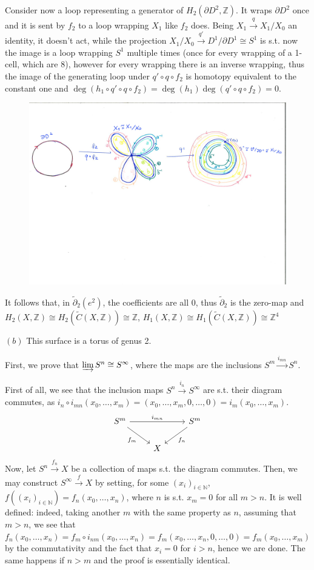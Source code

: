 \documentclass{article}
\newcommand{\numberset}{\mathbb}
\newcommand{\N}{\numberset{N}}
\newcommand{\Z}{\numberset{Z}}
\newcommand{\exercise}[1]{\noindent {\bf Exercise #1}}
\begin{document}
Consider now a loop representing a generator of $H_2(\partial D^2,\Z)$. It wraps $\partial D^2$ once and it is sent by $f_2$ to a loop wrapping $X_1$ like $f_2$ does. Being $X_1\xrightarrow{q} X_1/X_0$ an identity, it doesn't act, while the projection $X_1/X_0\xrightarrow{q'} D^1/\partial D^1\cong S^1$ is s.t. now the image is a loop wrapping $S^1$ multiple times (once for every wrapping of a 1-cell, which are 8), however for every wrapping there is an inverse wrapping, thus the image of the generating loop under $q'\circ q\circ f_2$ is homotopy equivalent to the constant one and $\deg(h_1\circ q'\circ q\circ f_2)=\deg(h_1)\deg(q'\circ q\circ f_2)=0$.
\begin{figure}
  \includegraphics[width=\linewidth]{pic1ass8at1.pdf}
\end{figure}
It follows that, in $\tilde{\partial}_2(e^2)$, the coefficients are all 0, thus $\tilde{\partial}_2$ is the zero-map and $H_2(X,\Z)\cong H_2(\tilde{C}(X,\Z))\cong\Z$, $H_1(X,\Z)\cong H_1(\tilde{C}(X,\Z))\cong\Z^4$

$(b)$ This surface is a torus of genus 2.

\newpage
\exercise{10.1}

First, we prove that $\varinjlim S^n\cong S^{\infty}$, where the maps are the inclusions $S^m\xrightarrow{i_{mn}} S^n$.

First of all, we see that the inclusion maps $S^n\xrightarrow{i_n} S^{\infty}$ are s.t. their diagram commutes, as $i_n\circ i_{mn}(x_0,\ldots,x_m)=(x_0,\ldots,x_m,0,\ldots,0)=i_m(x_0,\ldots,x_m)$.
\[
  \begin{tikzcd}
    S^m\arrow{rr}{i_{mn}}\arrow[swap]{dr}{f_m} & & S^m\arrow{dl}{f_n} \\
    & X
  \end{tikzcd}
\]
Now, let $S^n\xrightarrow{f_n} X$ be a collection of maps s.t. the diagram commutes. Then, we may construct $S^{\infty}\xrightarrow{f} X$ by setting, for some $(x_i)_{i\in\N}$, $f((x_i)_{i\in\N})=f_n(x_0,\ldots,x_n)$, where $n$ is s.t. $x_m=0$ for all $m>n$. It is well defined: indeed, taking another $m$ with the same property as $n$, assuming that $m>n$, we see that $f_n(x_0,\ldots,x_n)=f_m\circ i_{nm}(x_0,\ldots,x_n)=f_m(x_0,\ldots,x_n,0,\ldots,0)=f_m(x_0,\ldots,x_m)$ by the commutativity and the fact that $x_i=0$ for $i>n$, hence we are done. The same happens if $n>m$ and the proof is essentially identical.
\end{document}
